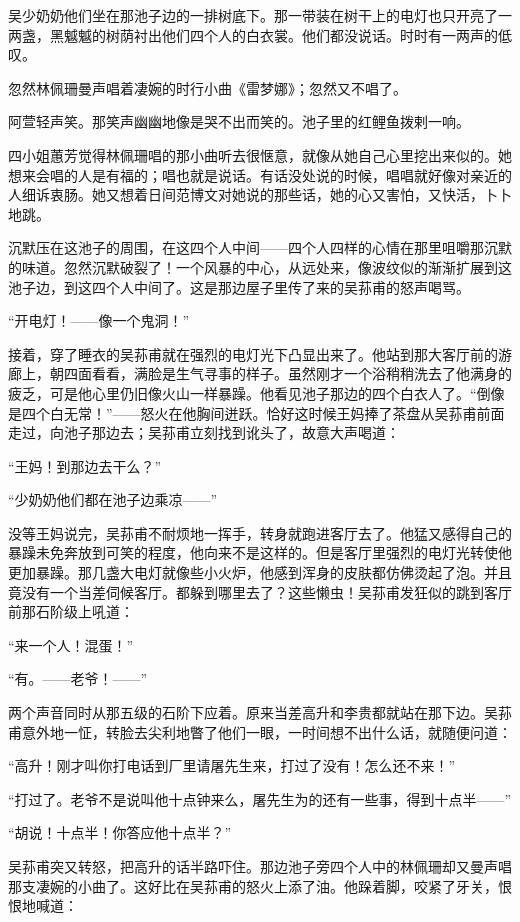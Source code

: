 \par 吴少奶奶他们坐在那池子边的一排树底下。那一带装在树干上的电灯也只开亮了一两盏，黑魆魆的树荫衬出他们四个人的白衣裳。他们都没说话。时时有一两声的低叹。
\par 忽然林佩珊曼声唱着凄婉的时行小曲《雷梦娜》；忽然又不唱了。
\par 阿萱轻声笑。那笑声幽幽地像是哭不出而笑的。池子里的红鲤鱼拨剌一响。
\par 四小姐蕙芳觉得林佩珊唱的那小曲听去很惬意，就像从她自己心里挖出来似的。她想来会唱的人是有福的；唱也就是说话。有话没处说的时候，唱唱就好像对亲近的人细诉衷肠。她又想着日间范博文对她说的那些话，她的心又害怕，又快活，卜卜地跳。
\par 沉默压在这池子的周围，在这四个人中间——四个人四样的心情在那里咀嚼那沉默的味道。忽然沉默破裂了！一个风暴的中心，从远处来，像波纹似的渐渐扩展到这池子边，到这四个人中间了。这是那边屋子里传了来的吴荪甫的怒声喝骂。
\par “开电灯！——像一个鬼洞！”
\par 接着，穿了睡衣的吴荪甫就在强烈的电灯光下凸显出来了。他站到那大客厅前的游廊上，朝四面看看，满脸是生气寻事的样子。虽然刚才一个浴稍稍洗去了他满身的疲乏，可是他心里仍旧像火山一样暴躁。他看见池子那边的四个白衣人了。“倒像是四个白无常！”——怒火在他胸间迸跃。恰好这时候王妈捧了茶盘从吴荪甫前面走过，向池子那边去；吴荪甫立刻找到讹头了，故意大声喝道：
\par “王妈！到那边去干么？”
\par “少奶奶他们都在池子边乘凉——”
\par 没等王妈说完，吴荪甫不耐烦地一挥手，转身就跑进客厅去了。他猛又感得自己的暴躁未免奔放到可笑的程度，他向来不是这样的。但是客厅里强烈的电灯光转使他更加暴躁。那几盏大电灯就像些小火炉，他感到浑身的皮肤都仿佛烫起了泡。并且竟没有一个当差伺候客厅。都躲到哪里去了？这些懒虫！吴荪甫发狂似的跳到客厅前那石阶级上吼道：
\par “来一个人！混蛋！”
\par “有。——老爷！——”
\par 两个声音同时从那五级的石阶下应着。原来当差高升和李贵都就站在那下边。吴荪甫意外地一怔，转脸去尖利地瞥了他们一眼，一时间想不出什么话，就随便问道：
\par “高升！刚才叫你打电话到厂里请屠先生来，打过了没有！怎么还不来！”
\par “打过了。老爷不是说叫他十点钟来么，屠先生为的还有一些事，得到十点半——”
\par “胡说！十点半！你答应他十点半？”
\par 吴荪甫突又转怒，把高升的话半路吓住。那边池子旁四个人中的林佩珊却又曼声唱那支凄婉的小曲了。这好比在吴荪甫的怒火上添了油。他跺着脚，咬紧了牙关，恨恨地喊道：
